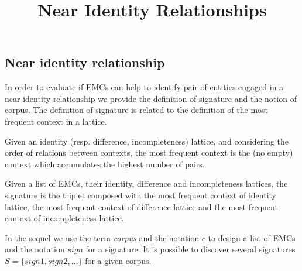 \documentclass[runningheads]{llncs}
\begin{document}
%
\title{Near Identity Relationships}
%
%
%
\maketitle              %
%

%
%
%





\subsection{Near identity relationship}
In order to evaluate if EMCs can help to identify pair of entities engaged in a near-identity relationship we provide the definition of signature and the notion of corpus.
The definition of signature is related to the definition of the most frequent context in a lattice.
\begin{definition}
Given an identity (resp. difference, incompleteness) lattice, and considering the order of relations between contexts, the most frequent context is the (no empty) context which accumulates the highest number of pairs.
\end{definition}

\begin{definition}[Signature] \label{def:signature}
Given a list of EMCs, their identity, difference and incompleteness lattices, the signature is the triplet composed with the most frequent context of identity lattice, the most frequent context of difference lattice and the most frequent context of incompleteness lattice.  
\end{definition}
In the sequel we use the term \textit{corpus} and the notation $c$ to design a list of EMCs and the notation $sign$ for a signature.
It is possible to discover several signatures $S=\{sign1, sign2, ...\}$ for a given corpus. 
\end{document}
